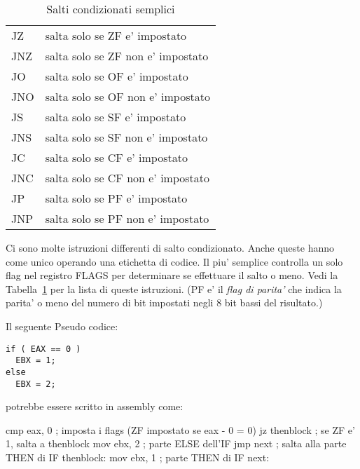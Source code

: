 \begin{table}[t]
\center
\begin{tabular}{|ll|}
\hline
JZ  & salta solo se ZF e' impostato \\
JNZ & salta solo se ZF non e' impostato \\
JO  & salta solo se OF e' impostato \\
JNO & salta solo se OF non e' impostato \\
JS  & salta solo se SF e' impostato \\
JNS & salta solo se SF non e' impostato \\
JC  & salta solo se CF e' impostato \\
JNC & salta solo se CF non e' impostato \\
JP  & salta solo se PF e' impostato \\
JNP & salta solo se PF non e' impostato \\
\hline
\end{tabular}
\caption{Salti condizionati semplici \label{tab:SimpBran}  
             
         }
\end{table}

Ci sono molte istruzioni differenti di salto condizionato. Anche queste
hanno come unico operando una etichetta di codice. Il piu' semplice
controlla un solo flag nel registro FLAGS per determinare se effettuare
il salto o meno. Vedi la Tabella~\ref{tab:SimpBran} per la lista di
queste istruzioni. (PF e' il \emph{flag di parita'} 
che indica la parita' o meno del numero di bit impostati negli 8 bit bassi
del risultato.)

Il seguente Pseudo codice:
\begin{Verbatim}
if ( EAX == 0 )
  EBX = 1;
else
  EBX = 2;
\end{Verbatim}
potrebbe essere scritto in assembly come:
\begin{AsmCodeListing}[frame=none]
      cmp    eax, 0            ; imposta i flags (ZF impostato se eax - 0 = 0)
      jz     thenblock         ; se ZF e' 1, salta a thenblock
      mov    ebx, 2            ; parte ELSE dell'IF
      jmp    next              ; salta alla parte THEN di IF
thenblock:
      mov    ebx, 1            ; parte THEN di IF
next:
\end{AsmCodeListing}

